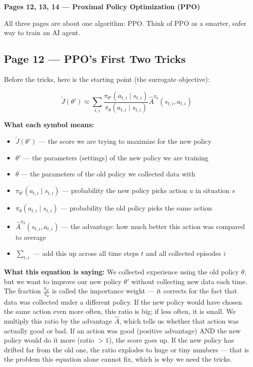 \bigskip

\textbf{Pages 12, 13, 14 --- Proximal Policy Optimization (PPO)}

All three pages are about one algorithm: PPO. Think of PPO as a smarter, safer way to train an AI agent.

\subsection*{Page 12 --- PPO's First Two Tricks}

Before the tricks, here is the starting point (the surrogate objective):

\[
\tilde{J}(\theta') \approx \sum_{t,i} \frac{\pi_{\theta'}(a_{t,i} \mid s_{t,i})}{\pi_\theta(a_{t,i} \mid s_{t,i})} \hat{A}^{\pi_\theta}(s_{t,i}, a_{t,i})
\]

\textbf{What each symbol means:}
\begin{itemize}
    \item $\tilde{J}(\theta')$ --- the score we are trying to maximize for the new policy
    \item $\theta'$ --- the parameters (settings) of the new policy we are training
    \item $\theta$ --- the parameters of the old policy we collected data with
    \item $\pi_{\theta'}(a_{t,i} \mid s_{t,i})$ --- probability the new policy picks action $a$ in situation $s$
    \item $\pi_\theta(a_{t,i} \mid s_{t,i})$ --- probability the old policy picks the same action
    \item $\hat{A}^{\pi_\theta}(s_{t,i}, a_{t,i})$ --- the advantage: how much better this action was compared to average
    \item $\sum_{t,i}$ --- add this up across all time steps $t$ and all collected episodes $i$
\end{itemize}

\textbf{What this equation is saying:}
We collected experience using the old policy $\theta$, but we want to improve our new policy $\theta'$ without collecting new data each time. The fraction $\frac{\pi_{\theta'}}{\pi_\theta}$ is called the importance weight --- it corrects for the fact that data was collected under a different policy. If the new policy would have chosen the same action even more often, this ratio is big; if less often, it is small. We multiply this ratio by the advantage $\hat{A}$, which tells us whether that action was actually good or bad. If an action was good (positive advantage) AND the new policy would do it more (ratio $> 1$), the score goes up. If the new policy has drifted far from the old one, the ratio explodes to huge or tiny numbers --- that is the problem this equation alone cannot fix, which is why we need the tricks.

